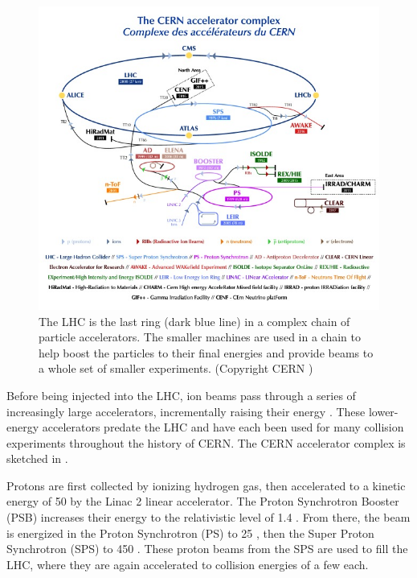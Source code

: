 \begin{figure}[t]
\includegraphics[width=0.8\linewidth]{CCC-v2018-print-v2.jpg}
\caption{The LHC is the last ring (dark blue line) in a complex chain of particle accelerators. The smaller machines are used in a chain to help boost the particles to their final energies and provide beams to a whole set of smaller experiments. (Copyright CERN \cite{Mobs:2636343})}
\label{fig:injection_chain}
\end{figure}

Before being injected into the LHC, ion beams pass through a series of increasingly large accelerators, incrementally raising their energy \cite{Benedikt:2004wm}.
These lower-energy accelerators predate the LHC and have each been used for many collision experiments throughout the history of CERN.
The CERN accelerator complex is sketched in \Fig{\ref{fig:injection_chain}}.

Protons are first collected by ionizing hydrogen gas, then accelerated to a kinetic energy of 50 \MeV by the Linac 2 linear accelerator.
The Proton Synchrotron Booster (PSB) increases their energy to the relativistic level of 1.4 \GeV.
From there, the beam is energized in the Proton Synchrotron (PS) to 25 \GeV, then the Super Proton Synchrotron (SPS) to 450 \GeV.
These proton beams from the SPS are used to fill the LHC, where they are again accelerated to collision energies of a few \TeV each.

